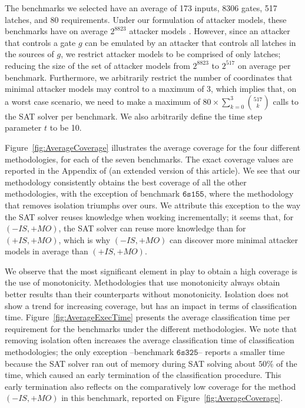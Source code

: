{{The benchmarks we selected have an average of 173 inputs, 8306 gates, 517 latches, and 80 requirements. } Under our formulation of attacker models, these benchmarks have on average $2^{8823}$ attacker models%
. However, since an attacker that controls a gate $g$ can be emulated by an attacker that controls all latches in the sources of $g$, we restrict attacker models to be comprised of only latches; reducing the size of the set of attacker models from $2^{8823}$ to $2^{517}$ on average per benchmark. Furthermore, we arbitrarily restrict the number of coordinates that minimal attacker models may control to a maximum of 3, which implies that, on a worst case scenario, we need to make a maximum of $80\times\sum_{k=0}^3 \binom {517}k$ calls to the SAT solver per benchmark. We also arbitrarily define the time step parameter $t$ to be 10.

Figure~\ref{fig:AverageCoverage} illustrates the average coverage for the four different methodologies, for each of the seven benchmarks. The exact coverage values are reported in the Appendix of \cite{aig-ac-arxiv} (an extended version of this article). We see that our methodology consistently obtains the best coverage of all the other methodologies, with the exception of benchmark $\mathtt{6s155}$, where the methodology that removes isolation triumphs over ours. We attribute this exception to the way the SAT solver reuses knowledge when working incrementally; it seems that, for $(-IS,+MO)$, the SAT solver can reuse more knowledge than for $(+IS,+MO)$, which is why $(-IS,+MO)$ can discover more minimal attacker models in average than $(+IS,+MO)$. 


We observe that the most significant element in play to obtain a high coverage is the use of monotonicity. Methodologies that use monotonicity always obtain better results than their counterparts without monotonicity. Isolation does not show a trend for increasing coverage, but has an impact in terms of classification time. Figure~\ref{fig:AverageExecTime} presents the average classification time per requirement for the benchmarks under the different methodologies. We note that removing isolation often increases the average classification time of classification methodologies; the only exception --benchmark $\mathtt{6s325}$-- reports a smaller time because the SAT solver ran out of memory during SAT solving about $50\%$ of the time, which caused an early termination of the classification procedure. This early termination also reflects on the comparatively low coverage for the method $(-IS,+MO)$ in this benchmark, reported on Figure~\ref{fig:AverageCoverage}.

}
